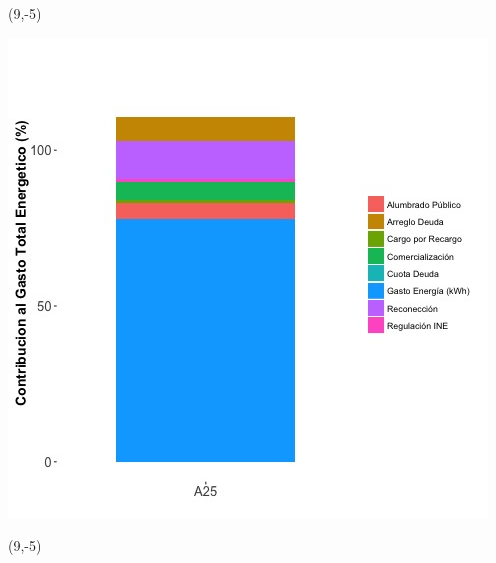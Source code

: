 \documentclass{article}\usepackage[]{graphicx}\usepackage[]{color}
\newenvironment{knitrout}{}{} %
\begin{document}
 \begin{textblock}{1}(9,-5)
\begin{minipage}{20em}
\begingroup

\endgroup
\end{minipage}
\end{textblock}

\begin{knitrout}
\color{fgcolor}
\includegraphics[scale=0.65]{figure/A25_costvars_plot.jpg} 
\end{knitrout}

 \begin{textblock}{1}(9,-5)
\begin{minipage}{20em}
\begingroup

\endgroup
\end{minipage}
\end{textblock}
\end{document}
